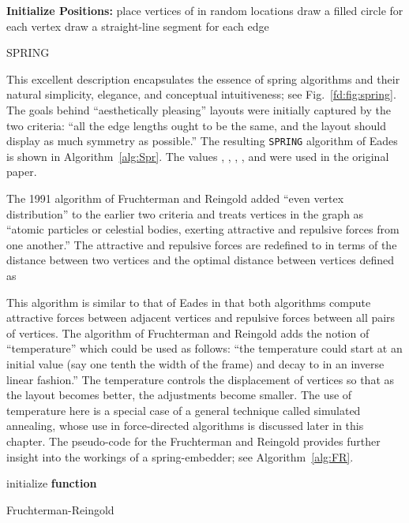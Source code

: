 \documentclass[notitlepage,letter,11pt]{article}
\begin{document}
\begin{algorithm}
{\bf Initialize Positions:} place vertices of  in random locations\;
draw a filled circle for each vertex\;
draw a straight-line segment for each edge\;
\caption{SPRING \label{alg:Spr}}
\end{algorithm}




This excellent description encapsulates the essence of spring
algorithms and their natural simplicity, elegance, and conceptual
intuitiveness; see Fig.~\ref{fd:fig:spring}. The goals behind ``aesthetically pleasing'' layouts
were initially captured by the two criteria: ``all the edge lengths
ought to be the same, and the layout should display as much symmetry
as possible.'' The resulting {\tt SPRING} algorithm of Eades is shown in Algorithm~\ref{alg:Spr}. The values , , , , and  were used in the original paper. 


The 1991 algorithm of Fruchterman and Reingold added ``even vertex
distribution'' to the earlier two criteria and treats vertices in the
graph as ``atomic particles or celestial bodies, exerting attractive
and repulsive forces from one another.'' The attractive and repulsive
forces are redefined to 
in terms of the distance  between two vertices and the optimal distance between vertices  defined as 


This algorithm is similar to that of Eades in that both algorithms
compute attractive forces between adjacent vertices and repulsive
forces between all pairs of vertices. The algorithm of Fruchterman and
Reingold adds the notion of ``temperature'' which could be used as
follows: ``the temperature could start at an initial value (say one
tenth the width of the frame) and decay to  in an inverse linear
fashion.'' The temperature controls the displacement of vertices so
that as the layout becomes better, the adjustments become smaller. The
use of temperature here is a special case of a general technique
called simulated annealing, whose use in force-directed algorithms is
discussed later in this chapter. The pseudo-code for the Fruchterman
and Reingold provides further insight into the workings of a
spring-embedder; see Algorithm~\ref{alg:FR}.


\begin{algorithm}
initialize  
{\bf function}  
\caption{Fruchterman-Reingold\label{alg:FR}}
\end{algorithm}
\end{document}

